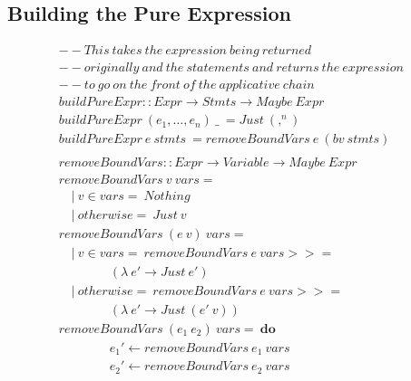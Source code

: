 \DIFdelbegin \subsubsection{}
\addtocounter{subsubsection}{-1}%
\DIFdelend \DIFaddbegin \subsection{Building the Pure Expression}
\DIFaddend 

\vspace{5pt}
\DIFdelbegin %
\DIFdelendFL \DIFaddbeginFL \begin{figure}[h!]
\DIFaddendFL \begin{math}
\begin{aligned}
&--This\ takes\ the\ expression\ being\ returned\\
&--originally\ and\ the\ statements\ and\ returns\ the\ expression\\
&--to\ go\ on\ the\ front\ of\ the\ applicative\ chain\\
&buildPureExpr :: Expr \rightarrow Stmts \rightarrow Maybe\ Expr\\
&buildPureExpr\ (e_1,\ldots, e_n)\ \_\ = Just\ (,^n)\\
&buildPureExpr\ e\ stmts\ = removeBoundVars\ e\ (bv\ stmts)\\
\\
&removeBoundVars :: Expr \rightarrow {Variable} \rightarrow Maybe\ Expr\\
&removeBoundVars\ v\ vars =\\
&\quad |\ v \in vars =\ Nothing\\
&\quad |\ otherwise =\ Just\ v\\
&removeBoundVars\ (e\ v)\ vars =\\
&\quad |\ v \in vars =\ removeBoundVars\ e\ vars >>=\\ 
&\qquad \qquad(\lambda\ e' \rightarrow Just\ e')\\
&\quad |\ otherwise =\ removeBoundVars\ e\ vars >>=\\ 
&\qquad \qquad(\lambda\ e' \rightarrow Just\ (e'\ v))\\
&removeBoundVars\ (e_1\ e_2)\ vars =\ \textbf{do}\\
&\qquad \qquad e_1' \leftarrow removeBoundVars\ e_1\ vars\\
&\qquad \qquad e_2' \leftarrow removeBoundVars\ e_2\ vars\\

\end{aligned}
\end{math}
\end{figure}
